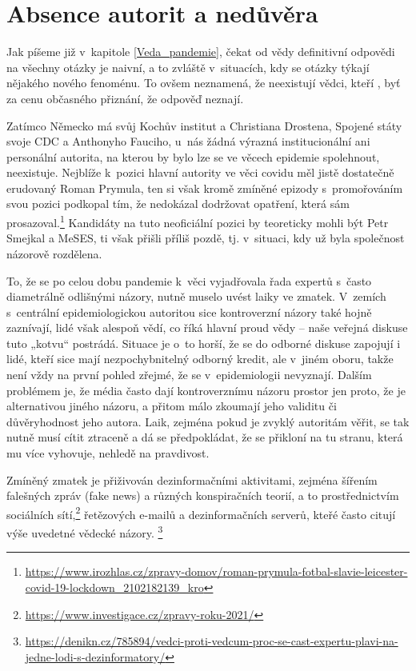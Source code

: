 \section*{Absence autorit a nedůvěra}

Jak píšeme již v~kapitole \ref{Veda_pandemie}, čekat od vědy definitivní odpovědi na všechny otázky je naivní, a to zvláště v~situacích, kdy se otázky týkají nějakého nového fenoménu. To ovšem neznamená, že neexistují vědci, kteří , byť za cenu občasného přiznání, že odpověď neznají. 

Zatímco Německo má svůj Kochův institut a Christiana Drostena, Spojené státy svoje CDC a Anthonyho Fauciho, u~nás žádná výrazná institucionální ani personální autorita, na kterou by bylo lze se ve věcech epidemie spolehnout, neexistuje. Nejblíže k~pozici hlavní autority ve věci covidu měl jistě dostatečně erudovaný Roman Prymula, ten si však kromě zmíněné epizody s~promořováním svou pozici podkopal tím, že nedokázal dodržovat opatření, která sám prosazoval.\footnote{\url{https://www.irozhlas.cz/zpravy-domov/roman-prymula-fotbal-slavie-leicester-covid-19-lockdown_2102182139_kro}} Kandidáty na tuto neoficiální pozici by teoreticky mohli být Petr Smejkal a MeSES, ti však přišli příliš pozdě, tj. v~situaci, kdy už byla společnost názorově rozdělena.

To, že se po celou dobu pandemie k~věci vyjadřovala řada expertů s~často diametrálně odlišnými názory, nutně muselo uvést laiky ve zmatek. V~zemích s~centrální epidemiologickou autoritou sice kontroverzní názory také hojně zaznívají, lidé však alespoň vědí, co říká hlavní proud vědy -- naše veřejná diskuse tuto „kotvu“ postrádá. Situace je o~to horší, že se do odborné diskuse zapojují i lidé, kteří sice mají nezpochybnitelný odborný kredit, ale v~jiném oboru, takže není vždy na první pohled zřejmé, že se v~epidemiologii nevyznají. Dalším problémem je, že média často dají kontroverznímu názoru prostor jen proto, že je alternativou jiného názoru, a přitom málo zkoumají jeho validitu či důvěryhodnost jeho autora. Laik, zejména pokud je zvyklý autoritám věřit, se tak nutně musí cítit ztraceně a dá se předpokládat, že se přikloní na tu stranu, která mu více vyhovuje, nehledě na pravdivost.

Zmíněný zmatek je přiživován dezinformačními aktivitami, zejména šířením fa\-leš\-ných zpráv (fake news) a různých konspiračních teorií, a to prostřednictvím sociálních sítí,\footnote{\url{https://www.investigace.cz/zpravy-roku-2021/}} řetězových e-mailů a dezinformačních serverů, kteřé často citují výše uvedetné  vědecké názory. \footnote{\url{https://denikn.cz/785894/vedci-proti-vedcum-proc-se-cast-expertu-plavi-na-jedne-lodi-s-dezinformatory/}}

